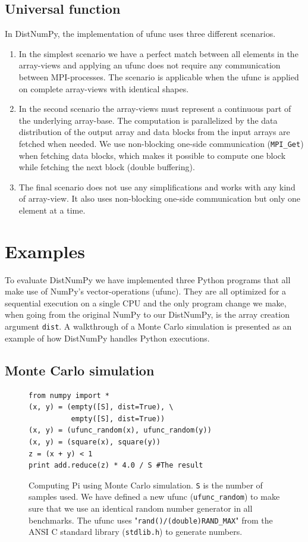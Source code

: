 \documentclass[10pt]{article}
\begin{document}
\subsection{Universal function}
In DistNumPy, the implementation of ufunc uses three different scenarios.
\begin{enumerate}
\item In the simplest scenario we have a perfect match between all elements in the array-views and applying an ufunc does not require any communication between MPI-processes. The scenario is applicable when the ufunc is applied on complete array-views with identical shapes.
\item In the second scenario the array-views must represent a continuous part of the underlying array-base. The computation is parallelized by the data distribution of the output array and data blocks from the input arrays are fetched when needed. We use non-blocking one-side communication (\texttt{MPI\_Get}) when fetching data blocks, which makes it possible to compute one block while fetching the next block (double buffering).
\item The final scenario does not use any simplifications and works with any kind of array-view. It also uses non-blocking one-side communication but only one element at a time.
\end{enumerate}


\section{Examples}\label{sec:examples}
To evaluate DistNumPy we have implemented three Python programs that all make use of NumPy's vector-operations (ufunc). They are all optimized for a sequential execution on a single CPU and the only program change we make, when going from the original NumPy to our DistNumPy, is the array creation argument \texttt{dist}. 
A walkthrough of a Monte Carlo simulation is presented as an example of how DistNumPy handles Python executions.


\subsection{Monte Carlo simulation}
\begin{figure}
\begin{lstlisting}
from numpy import *
(x, y) = (empty([S], dist=True), \
		  empty([S], dist=True))
(x, y) = (ufunc_random(x), ufunc_random(y))
(x, y) = (square(x), square(y))
z = (x + y) < 1
print add.reduce(z) * 4.0 / S #The result
\end{lstlisting}
 \caption{Computing Pi using Monte Carlo simulation. \texttt{S} is the number of samples used. We have defined a new ufunc (\texttt{ufunc\_random}) to make sure that we use an identical random number generator in all benchmarks. The ufunc uses "\texttt{rand()/(double)RAND\_MAX}" from the ANSI C standard library (\texttt{stdlib.h}) to generate numbers.}
 \label{lst:montecarlo}
\end{figure}
\end{document}

